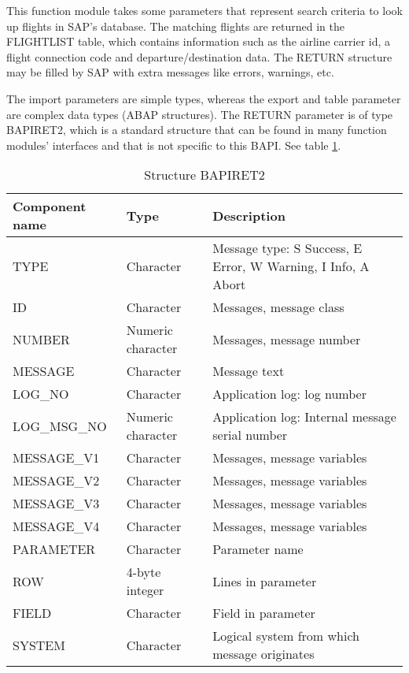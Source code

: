 This function module takes some parameters that represent search criteria to look up flights in SAP's database.
The matching flights are returned in the FLIGHTLIST table, which contains information such as
the airline carrier id, a flight connection code and departure/destination data.
The RETURN structure may be filled by SAP with extra messages like errors, warnings, etc.

The import parameters are simple types, whereas the export and table parameter are complex data types (ABAP structures).
The RETURN parameter is of type BAPIRET2, which is a standard structure that can be found in many function modules'
interfaces and that is not specific to this BAPI. See table \ref{tab:Bapiret2}.

\begin{table}
  \centering
  \begin{tabular}{lll} \toprule 
    \textbf{Component name} & \textbf{Type}     & \textbf{Description} \\ \midrule
    TYPE                    & Character         & Message type: S Success, E Error, W Warning, I Info, A Abort \\ 
    ID                      & Character         & Messages, message class \\  
    NUMBER                  & Numeric character & Messages, message number \\ 
    MESSAGE                 & Character         & Message text \\ 
    LOG\_NO                 & Character         & Application log: log number \\ 
    LOG\_MSG\_NO            & Numeric character & Application log: Internal message serial number \\ 
    MESSAGE\_V1             & Character         & Messages, message variables \\ 
    MESSAGE\_V2             & Character         & Messages, message variables \\ 
    MESSAGE\_V3             & Character         & Messages, message variables \\ 
    MESSAGE\_V4             & Character         & Messages, message variables \\ 
    PARAMETER               & Character         & Parameter name \\ 
    ROW                     & 4-byte integer    & Lines in parameter \\ 
    FIELD                   & Character         & Field in parameter \\ 
    SYSTEM                  & Character         & Logical system from which message originates \\ \bottomrule
  \end{tabular}
  \caption{Structure BAPIRET2}
  \label{tab:Bapiret2}
\end{table}

